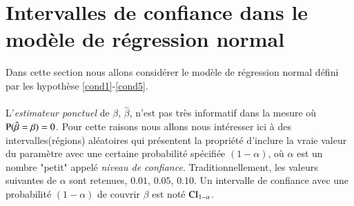 \documentclass[10pt, reqno]{amsart}
\begin{document}
\newpage

\section{Intervalles de confiance dans le modèle de régression normal}

Dans cette section nous allons considérer le modèle de régression normal défini par les hypothèse \ref{cond1}-\ref{cond5}.\\\\
L'\emph{estimateur ponctuel} de $\beta$, $\hat{\beta}$, n'est pas très informatif dans la mesure où $\operatorname{P}(\hat{\beta}=\beta)=0$. Pour cette raisons nous allons nous intéresser ici à des intervalles(régions) aléatoires qui présentent la propriété d'inclure la vraie valeur du paramètre avec une certaine probabilité spécifiée $(1-\alpha)$, où $\alpha$ est un nombre "petit" appelé \emph{niveau de confiance}. Traditionnellement, les valeurs suivantes de $\alpha$ sont retenues, $0.01$, $0.05$, $0.10$. Un intervalle de confiance avec une probabilité  $(1-\alpha)$ de couvrir $\beta$ est noté $\mathrm{CI}_{1-\alpha}$.
\end{document}
